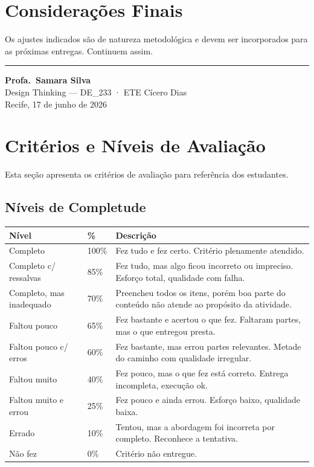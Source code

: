 \documentclass[
  sigconf,
  nonacm, %
  language=portuguese
]{acmart}
\begin{document}
\section{Considerações Finais}

Os ajustes indicados são de natureza metodológica e devem ser
incorporados para as próximas entregas.
Continuem assim.


\vspace{1.5em}
\noindent\rule{\linewidth}{0.4pt}

\begin{flushright}
\textbf{Profa.\ Samara Silva}\\
{\small\color{cmuted} Design Thinking --- DE\_233 · ETE Cícero Dias}\\
{\small\color{cmuted} Recife, 17 de junho de 2026}
\end{flushright}


\appendix
\onecolumn
\section{Critérios e Níveis de Avaliação}

Esta seção apresenta os critérios de avaliação para referência dos estudantes.

\subsection{Níveis de Completude}

\begin{tabularx}{\linewidth}{@{} p{4cm} p{1.5cm} X @{}}
\toprule
\textbf{Nível} & \textbf{\%} & \textbf{Descrição} \\
\midrule
Completo & 100\% & Fez tudo e fez certo. Critério plenamente atendido. \\
Completo c/ ressalvas & 85\% & Fez tudo, mas algo ficou incorreto ou impreciso. Esforço total, qualidade com falha. \\
Completo, mas inadequado & 70\% & Preencheu todos os itens, porém boa parte do conteúdo não atende ao propósito da atividade. \\
Faltou pouco & 65\% & Fez bastante e acertou o que fez. Faltaram partes, mas o que entregou presta. \\
Faltou pouco c/ erros & 60\% & Fez bastante, mas errou partes relevantes. Metade do caminho com qualidade irregular. \\
Faltou muito & 40\% & Fez pouco, mas o que fez está correto. Entrega incompleta, execução ok. \\
Faltou muito e errou & 25\% & Fez pouco e ainda errou. Esforço baixo, qualidade baixa. \\
Errado & 10\% & Tentou, mas a abordagem foi incorreta por completo. Reconhece a tentativa. \\
Não fez & 0\% & Critério não entregue. \\
\bottomrule
\end{tabularx}
\end{document}
